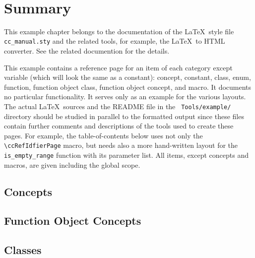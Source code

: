 
\\

\section*{Summary}

This example chapter belongs to the documentation of the \LaTeX\ style
file {\tt cc\_manual.sty} and the related tools, for example, the
\LaTeX\ to HTML converter. See the related documention for the details.

This example contains a reference page for an item of each category except
variable (which will look the same as a constant):
concept, constant, class, enum, function, function object class, function
object concept, and macro. It documents no
particular functionality. It serves only as an example for the various
layouts. The actual \LaTeX\ sources and the README file in the {\tt
  Tools/example/} directory should be studied in parallel to the
formatted output since these files contain further comments and 
descriptions of the tools used to create these pages. 
For example, the
table-of-contents below uses not only the \verb+\ccRefIdfierPage+
macro, but needs also a more hand-written layout for the
\verb+is_empty_range+ function with its parameter list.  All items,
except concepts and macros, are given including the global scope.


\subsection*{Concepts}


\subsection*{Function Object Concepts}


\subsection*{Classes}

